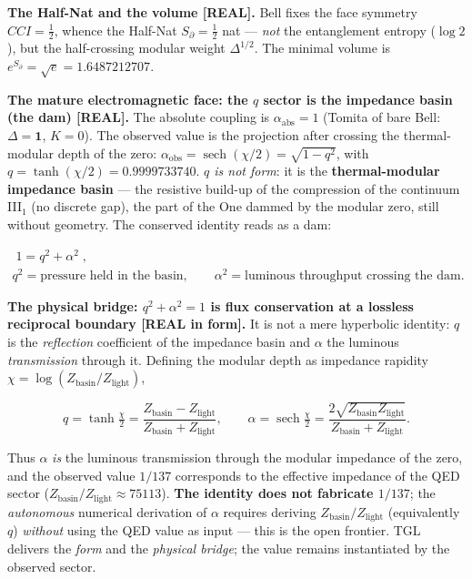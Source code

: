 \documentclass[11pt]{article}
\theoremstyle{definition}\newtheorem{deriv}{Derivation}
\begin{document}
\textbf{The Half-Nat and the volume \textsf{[REAL]}.} Bell fixes the face symmetry $CCI=\tfrac12$, whence the Half-Nat $S_\partial=\tfrac12$ nat --- \emph{not} the entanglement entropy ($\log 2$), but the half-crossing modular weight $\Delta^{1/2}$. The minimal volume is $e^{S_\partial}=\sqrt e=1.6487212707$.

\textbf{The mature electromagnetic face: the $q$ sector is the impedance basin (the dam) \textsf{[REAL]}.} The absolute coupling is $\alpha_{\mathrm{abs}}=1$ (Tomita of bare Bell: $\Delta=\mathbf 1$, $K=0$). The observed value is the projection after crossing the thermal-modular depth of the zero: $\alpha_{\mathrm{obs}}=\operatorname{sech}(\chi/2)=\sqrt{1-q^2}$, with $q=\tanh(\chi/2)=0.9999733740$. \emph{$q$ is not form}: it is the \textbf{thermal-modular impedance basin} --- the resistive build-up of the compression of the continuum \mbox{III$_1$} (no discrete gap), the part of the One dammed by the modular zero, still without geometry. The conserved identity reads as a dam:

\begin{equation}\begin{gathered}\boxed{\;1=q^2+\alpha^2\;},\\ q^2=\text{pressure held in the basin},\qquad \alpha^2=\text{luminous throughput crossing the dam}.\end{gathered}\end{equation}

\textbf{The physical bridge: $q^2+\alpha^2=1$ is flux conservation at a lossless reciprocal boundary \textsf{[REAL in form]}.} It is not a mere hyperbolic identity: $q$ is the \emph{reflection} coefficient of the impedance basin and $\alpha$ the luminous \emph{transmission} through it. Defining the modular depth as impedance rapidity $\chi=\log(Z_{\mathrm{basin}}/Z_{\mathrm{light}})$,

\begin{equation}q=\tanh\tfrac\chi2=\frac{Z_{\mathrm{basin}}-Z_{\mathrm{light}}}{Z_{\mathrm{basin}}+Z_{\mathrm{light}}},\qquad \alpha=\operatorname{sech}\tfrac\chi2=\frac{2\sqrt{Z_{\mathrm{basin}}Z_{\mathrm{light}}}}{Z_{\mathrm{basin}}+Z_{\mathrm{light}}}.\end{equation}

Thus $\alpha$ \emph{is} the luminous transmission through the modular impedance of the zero, and the observed value $1/137$ corresponds to the effective impedance of the QED sector ($Z_{\mathrm{basin}}/Z_{\mathrm{light}}\approx75113$). \textbf{The identity does not fabricate $1/137$}; the \emph{autonomous} numerical derivation of $\alpha$ requires deriving $Z_{\mathrm{basin}}/Z_{\mathrm{light}}$ (equivalently $q$) \emph{without} using the QED value as input --- this is the open frontier. TGL delivers the \emph{form} and the \emph{physical bridge}; the value remains instantiated by the observed sector.
\end{document}
